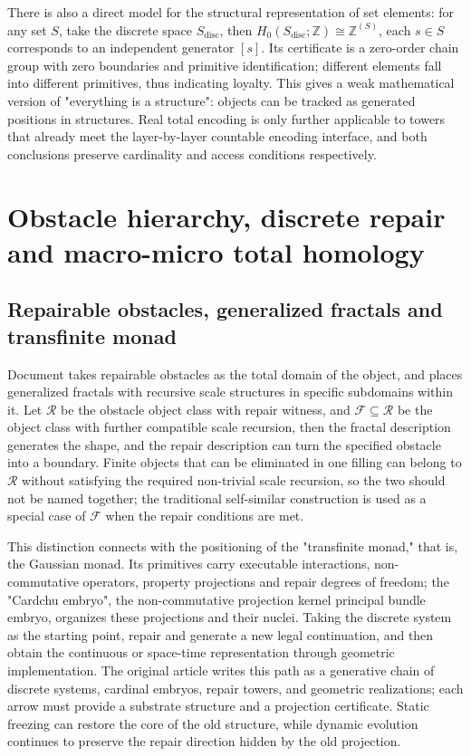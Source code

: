 \documentclass[11pt,a4paper]{article}
\theoremstyle{plain}
\theoremstyle{definition}
\theoremstyle{remark}
\begin{document}
\begin{CJK*}
There is also a direct model for the structural representation of set elements: for any set $S$, take the discrete space $S_{\mathrm{disc}}$, then $H_0(S_{\mathrm{disc}};\mathbb Z)\cong\mathbb Z^{(S)}$, each $s\in S$ corresponds to an independent generator $[s]$. Its certificate is a zero-order chain group with zero boundaries and primitive identification; different elements fall into different primitives, thus indicating loyalty. This gives a weak mathematical version of "everything is a structure": objects can be tracked as generated positions in structures. Real total encoding is only further applicable to towers that already meet the layer-by-layer countable encoding interface, and both conclusions preserve cardinality and access conditions respectively.

\section { Obstacle hierarchy, discrete repair and macro-micro total homology }\label{ss:repair}


\subsection { Repairable obstacles, generalized fractals and transfinite monad }

Document \cite{S18} takes repairable obstacles as the total domain of the object, and places generalized fractals with recursive scale structures in specific subdomains within it. Let $\mathcal R$ be the obstacle object class with repair witness, and $\mathcal F\subseteq\mathcal R$ be the object class with further compatible scale recursion, then the fractal description generates the shape, and the repair description can turn the specified obstacle into a boundary. Finite objects that can be eliminated in one filling can belong to $\mathcal R$ without satisfying the required non-trivial scale recursion, so the two should not be named together; the traditional self-similar construction is used as a special case of $\mathcal F$ when the repair conditions are met.

This distinction connects with the positioning of the "transfinite monad," that is, the Gaussian monad. Its primitives carry executable interactions, non-commutative operators, property projections and repair degrees of freedom; the "Cardchu embryo", the non-commutative projection kernel principal bundle embryo, organizes these projections and their nuclei. Taking the discrete system as the starting point, repair and generate a new legal continuation, and then obtain the continuous or space-time representation through geometric implementation. The original article writes this path as a generative chain of discrete systems, cardinal embryos, repair towers, and geometric realizations; each arrow must provide a substrate structure and a projection certificate. Static freezing can restore the core of the old structure, while dynamic evolution continues to preserve the repair direction hidden by the old projection.


\end{CJK*}
\end{document}
